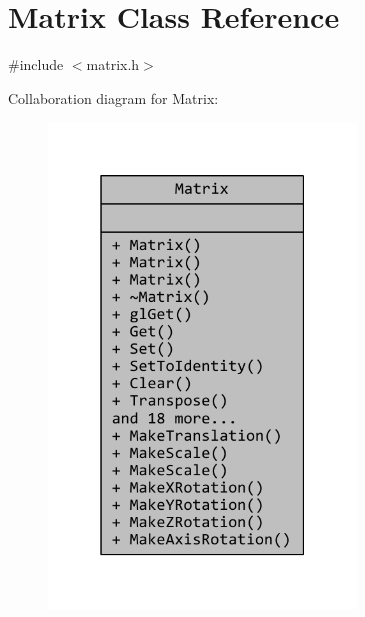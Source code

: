\hypertarget{classMatrix}{\section{Matrix Class Reference}
\label{classMatrix}
}


{\ttfamily \#include $<$matrix.\+h$>$}



Collaboration diagram for Matrix\+:
\nopagebreak
\begin{figure}[H]
\begin{center}
\leavevmode
\includegraphics[width=232pt]{classMatrix__coll__graph}
\end{center}
\end{figure}
